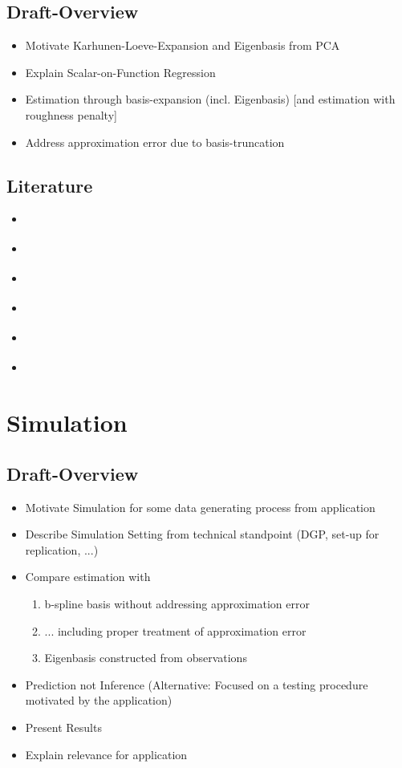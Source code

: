 \documentclass[11pt,twoside,a4paper]{article}
\begin{document}
	\subsection{Draft-Overview}
	\begin{itemize}
		\item Motivate Karhunen-Loeve-Expansion and Eigenbasis from PCA		
		\item Explain Scalar-on-Function Regression
		\item Estimation through basis-expansion (incl. Eigenbasis) [and estimation with roughness penalty]
		\item Address approximation error due to basis-truncation
	\end{itemize}

	\subsection{Literature}
	\begin{itemize}
		\item \cite{kokoszka_introduction_2017}
		\item \cite{hsing_theoretical_2015}
		\item \cite{ramsay_functional_2005}
		\item \cite{horvath_inference_2012}
		\item \cite{cai_prediction_2006}
		\item \cite{levitin_introduction_2007}
	\end{itemize}
	
	\newpage
	\section{Simulation}
	
	\subsection{Draft-Overview}
	\begin{itemize}
		\item Motivate Simulation for some data generating process from application
		\item Describe Simulation Setting from technical standpoint (DGP, set-up for replication, ...)
		
		\item Compare estimation with \begin{enumerate}
			\item b-spline basis without addressing approximation error
			\item ... including proper treatment of approximation error
			\item Eigenbasis constructed from observations
			\end{enumerate}
	
		\item Prediction not Inference (Alternative: Focused on a testing procedure motivated by the application)
		\item Present Results
		\item Explain relevance for application
	\end{itemize}
\end{document}
